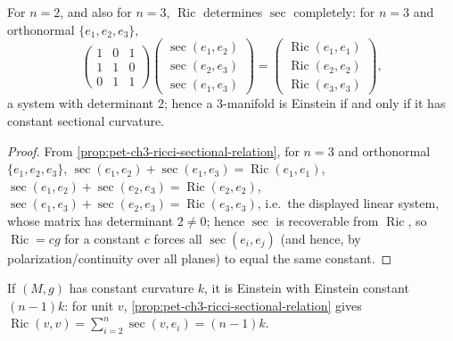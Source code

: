 \begin{corollary}
  \label{cor:pet-ch3-ricci-determines-sec-low-dim}
  \leanok
  For $n=2$, and also for $n=3$, $\operatorname{Ric}$ determines $\sec$
  completely: for $n=3$ and orthonormal $\{e_1,e_2,e_3\}$,
  \[
    \begin{pmatrix}1&0&1\\1&1&0\\0&1&1\end{pmatrix}
    \begin{pmatrix}\sec(e_1,e_2)\\\sec(e_2,e_3)\\\sec(e_1,e_3)\end{pmatrix}
    =\begin{pmatrix}\operatorname{Ric}(e_1,e_1)\\\operatorname{Ric}(e_2,e_2)\\\operatorname{Ric}(e_3,e_3)\end{pmatrix},
  \]
  a system with determinant $2$; hence a $3$-manifold is Einstein if and only
  if it has constant sectional curvature.
\end{corollary}
\begin{proof}
  \leanok
  From \cref{prop:pet-ch3-ricci-sectional-relation}, for $n=3$ and
  orthonormal $\{e_1,e_2,e_3\}$,
  $\sec(e_1,e_2)+\sec(e_1,e_3)=\operatorname{Ric}(e_1,e_1)$,
  $\sec(e_1,e_2)+\sec(e_2,e_3)=\operatorname{Ric}(e_2,e_2)$,
  $\sec(e_1,e_3)+\sec(e_2,e_3)=\operatorname{Ric}(e_3,e_3)$, i.e.\ the displayed
  linear system, whose matrix has determinant $2\ne0$; hence $\sec$ is
  recoverable from $\operatorname{Ric}$, so $\operatorname{Ric}=cg$ for a constant $c$
  forces all $\sec(e_i,e_j)$ (and hence, by polarization/continuity over all
  planes) to equal the same constant.
\end{proof}

\begin{remark}
  \label{rem:pet-ch3-constant-curvature-einstein}
  \leanok
  If $(M,g)$ has constant curvature $k$, it is Einstein with Einstein constant
  $(n-1)k$: for unit $v$, \cref{prop:pet-ch3-ricci-sectional-relation} gives
  $\operatorname{Ric}(v,v)=\sum_{i=2}^n\sec(v,e_i)=(n-1)k$.
\end{remark}

